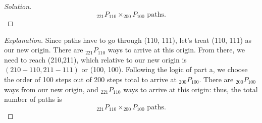 \documentclass[10pt]{article}
\begin{document}
\begin{proof}[Solution]
\[
    _{221} P_{110} \times _{200} P_{100} \text{ paths.}
\]
\end{proof}

\begin{proof}[Explanation]

Since paths have to go through (110, 111), let's treat (110, 111) as our new origin. There are  $_{221} P_{110}$ ways to arrive at this origin. From there, we need to reach (210,211), which relative to our new origin is $(210 - 110, 211 - 111)$ or (100, 100). Following the logic of part a, we choose the order of 100 steps out of 200 steps total to arrive at $_{200} P_{100}$. There are $_{200} P_{100}$ ways from our new origin, and $_{221} P_{110}$ ways to arrive at this origin: thus, the total number of paths is
\[
        _{221} P_{110} \times _{200} P_{100} \text{ paths.}
\]

\end{proof}
\end{document}
